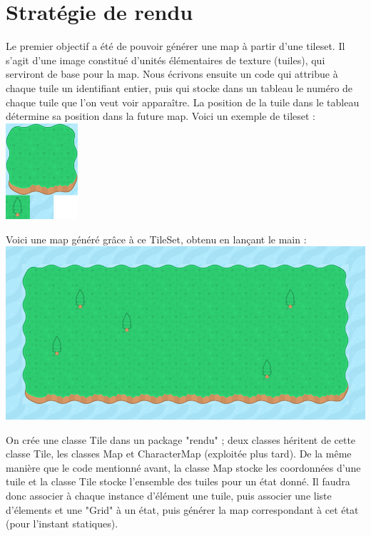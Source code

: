 \documentclass[12pt,a4paper]{report}
\begin{document}
    \section{Stratégie de rendu}

	Le premier objectif a été de pouvoir générer une map à partir d'une tileset. Il s'agit d'une image constitué d'unités élémentaires de texture (tuiles), qui serviront de base pour la map. Nous écrivons ensuite un code qui attribue à chaque tuile un identifiant entier, puis qui stocke dans un tableau le numéro de chaque tuile que l'on veut voir apparaître. La position de la tuile dans le tableau détermine sa position dans la future map. Voici un exemple de tileset :
\includegraphics[width=0.20\textwidth]{TileSet.png}\par\vspace{1cm}
Voici une map généré grâce à ce TileSet, obtenu en lançant le main : 
\includegraphics[width=1\textwidth]{map.png}

	On crée une classe Tile dans un package "rendu" ; deux classes héritent de cette classe Tile, les classes Map et CharacterMap (exploitée plus tard). De la même manière que le code mentionné avant, la classe Map stocke les coordonnées d'une tuile et la classe Tile stocke l'ensemble des tuiles pour un état donné. Il faudra donc associer à chaque instance d'élément une tuile, puis associer une liste d'élements et une "Grid" à un état, puis générer la map correspondant à cet état  (pour l'instant statiques).

\par\leavevmode\
\end{document}
